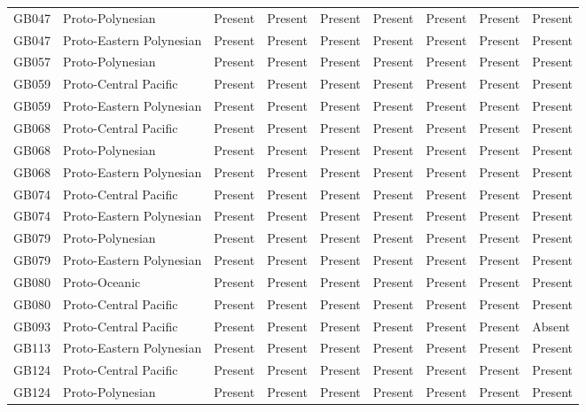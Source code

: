 \begin{longtable}{p{1.5cm}p{2.5cm}p{2.5cm}p{2.5cm}p{2.5cm}p{2.5cm}p{2.5cm}p{2.5cm}p{2.5cm}}
  GB047 & Proto-Polynesian & Present & Present & Present & Present & Present & Present & Present \\ 
  GB047 & Proto-Eastern Polynesian & Present & Present & Present & Present & Present & Present & Present \\ 
  GB057 & Proto-Polynesian & Present & Present & Present & Present & Present & Present & Present \\ 
  GB059 & Proto-Central Pacific & Present & Present & Present & Present & Present & Present & Present \\ 
  GB059 & Proto-Eastern Polynesian & Present & Present & Present & Present & Present & Present & Present \\ 
  GB068 & Proto-Central Pacific & Present & Present & Present & Present & Present & Present & Present \\ 
  GB068 & Proto-Polynesian & Present & Present & Present & Present & Present & Present & Present \\ 
  GB068 & Proto-Eastern Polynesian & Present & Present & Present & Present & Present & Present & Present \\ 
  GB074 & Proto-Central Pacific & Present & Present & Present & Present & Present & Present & Present \\ 
  GB074 & Proto-Eastern Polynesian & Present & Present & Present & Present & Present & Present & Present \\ 
  GB079 & Proto-Polynesian & Present & Present & Present & Present & Present & Present & Present \\ 
  GB079 & Proto-Eastern Polynesian & Present & Present & Present & Present & Present & Present & Present \\ 
  GB080 & Proto-Oceanic & Present & Present & Present & Present & Present & Present & Present \\ 
  GB080 & Proto-Central Pacific & Present & Present & Present & Present & Present & Present & Present \\ 
  GB093 & Proto-Central Pacific & Present & Present & Present & Present & Present & Present & Absent \\ 
  GB113 & Proto-Eastern Polynesian & Present & Present & Present & Present & Present & Present & Present \\ 
  GB124 & Proto-Central Pacific & Present & Present & Present & Present & Present & Present & Present \\ 
  GB124 & Proto-Polynesian & Present & Present & Present & Present & Present & Present & Present \\ 

\end{longtable}
